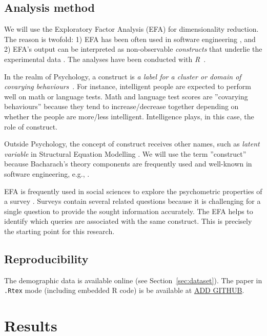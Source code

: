 \documentclass[10pt,conference]{IEEEtran}\usepackage[]{graphicx}\usepackage[table,xcdraw]{xcolor}
\begin{document}
\subsection{Analysis method}

We will use the Exploratory Factor Analysis (EFA) for dimensionality reduction. The reason is twofold: 1) EFA has been often used in software engineering \cite{siegmund2014measuring,barcomb2019episodic}, and 2) EFA's output can be interpreted as non-observable \textit{constructs} that underlie the experimental data \cite[Chapter 1]{watkins2020step}. The analyses have been conducted with \textit{R}~\cite{R}.

In the realm of Psychology, a construct is \textit{a label for a cluster or domain of covarying behaviours}~\cite{britannicaConstructPsychology}. For instance, intelligent people are expected to perform well on math or language tests. Math and language test scores are ''covarying behaviours'' because they tend to increase/decrease together depending on whether the people are more/less intelligent. Intelligence plays, in this case, the role of construct. 

Outside Psychology, the concept of construct receives other names, such as \textit{latent variable} in Structural Equation Modelling \cite{kline2015principles}. We will use the term ''construct'' because Bacharach's theory components \cite{bacharach1989organizational} are frequently used and well-known in software engineering, e.g., \cite{juristo2013basics,wohlin2012experimentation}.

EFA is frequently used in social sciences to explore the psychometric properties of a survey \cite{costello2005best}. Surveys contain several related questions because it is challenging for a single question to provide the sought information accurately. The EFA helps to identify which queries are associated with the same construct. This is precisely the starting point for this research.

\subsection{Reproducibility}

The demographic data is available online (see Section~\ref{sec:dataset}). The paper in \lstinline{.Rtex} mode (including embedded R code) is be available at \url{ADD GITHUB}.

\section{Results}
\end{document}
